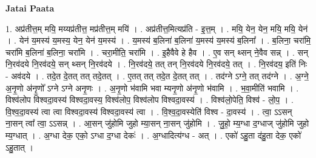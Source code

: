 \documentclass[17pt]{extarticle}
\begin{document}
\textbf{Jatai Paata} \newline

1. अप्र॑तीत्त॒म् मयि॒ मय्यप्र॑तीत्त॒ मप्र॑तीत्त॒म् मयि॑ । . अप्र॑तीत्त॒मित्यप्र॑ति - इ॒त्त॒म् । . मयि॒ येन॒ येन॒ मयि॒ मयि॒ येन॑ । . येन॑ य॒मस्य॑ य॒मस्य॒ येन॒ येन॑ य॒मस्य॑ । . य॒मस्य॑ ब॒लिना॑ ब॒लिना॑ य॒मस्य॑ य॒मस्य॑ ब॒लिना᳚ । . ब॒लिना॒ चरा॑मि॒ चरा॑मि ब॒लिना॑ ब॒लिना॒ चरा॑मि । . चरा॒मीति॒ चरा॑मि । . इ॒हैवैवे हे हैव । . ए॒व सन् थ्सन् ने॒वैव सन्न् । . सन् नि॒रव॑दये नि॒रव॑दये॒ सन् थ्सन् नि॒रव॑दये । . नि॒रव॑दये॒ तत् तन् नि॒रव॑दये नि॒रव॑दये॒ तत् । . नि॒रव॑दय॒ इति॑ निः - अव॑दये । . तदे॒त दे॒तत् तत् तदे॒तत् । . ए॒तत् तत् तदे॒त दे॒तत् तत् । . तद॑ग्ने ऽग्ने॒ तत् तद॑ग्ने । . अ॒ग्ने॒ अ॒नृ॒णो अ॑नृ॒णो᳚ ऽग्ने ऽग्ने अनृ॒णः । . अ॒नृ॒णो भ॑वामि भवा म्यनृ॒णो अ॑नृ॒णो भ॑वामि । . भ॒वा॒मीति॑ भवामि । . विश्व॑लोप विश्वदा॒वस्य॑ विश्वदा॒वस्य॒ विश्व॑लोप॒ विश्व॑लोप विश्वदा॒वस्य॑ । . विश्व॑लो॒पेति॒ विश्व॑ - लो॒प॒ । . वि॒श्व॒दा॒वस्य॑ त्वा त्वा विश्वदा॒वस्य॑ विश्वदा॒वस्य॑ त्वा । . वि॒श्व॒दा॒वस्येति॑ विश्व - दा॒वस्य॑ । . त्वा॒ ऽऽसन् ना॒सन् त्वा᳚ त्वा॒ ऽऽसन्न् । . आ॒सन् जु॑होमि जुहो म्या॒सन् ना॒सन् जु॑होमि । . जु॒हो॒ म्य॒ग्धा द॒ग्धाज् जु॑होमि जुहो म्य॒ग्धात् । . अ॒ग्धा देक॒ एको॒ ऽग्धा द॒ग्धा देकः॑ । . अ॒ग्धादित्य॑ग्ध - अत् । . एको॑ ऽहु॒ता द॑हु॒ता देक॒ एको॑ ऽहु॒तात् । \newline
\end{document}
